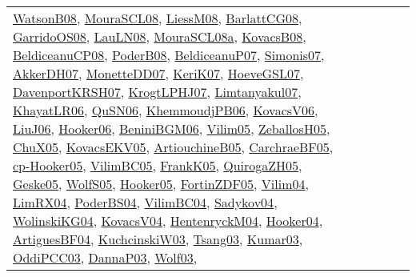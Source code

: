 {\begin{longtable}{lp{3cm}>{\raggedright}p{6cm}>{\raggedright}p{6cm}p{8cm}}
\href{papers/WatsonB08.pdf}{WatsonB08}\cite{WatsonB08}, \href{papers/MouraSCL08.pdf}{MouraSCL08}\cite{MouraSCL08}, \href{articles/LiessM08.pdf}{LiessM08}\cite{LiessM08}, \href{papers/BarlattCG08.pdf}{BarlattCG08}\cite{BarlattCG08}, \href{articles/GarridoOS08.pdf}{GarridoOS08}\cite{GarridoOS08}, \href{papers/LauLN08.pdf}{LauLN08}\cite{LauLN08}, \href{papers/MouraSCL08a.pdf}{MouraSCL08a}\cite{MouraSCL08a}, \href{articles/KovacsB08.pdf}{KovacsB08}\cite{KovacsB08}, \href{papers/BeldiceanuCP08.pdf}{BeldiceanuCP08}\cite{BeldiceanuCP08}, \href{papers/PoderB08.pdf}{PoderB08}\cite{PoderB08}, \href{papers/BeldiceanuP07.pdf}{BeldiceanuP07}\cite{BeldiceanuP07}, \href{articles/Simonis07.pdf}{Simonis07}\cite{Simonis07}, \href{papers/AkkerDH07.pdf}{AkkerDH07}\cite{AkkerDH07}, \href{papers/MonetteDD07.pdf}{MonetteDD07}\cite{MonetteDD07}, \href{papers/KeriK07.pdf}{KeriK07}\cite{KeriK07}, \href{papers/HoeveGSL07.pdf}{HoeveGSL07}\cite{HoeveGSL07}, \href{papers/DavenportKRSH07.pdf}{DavenportKRSH07}\cite{DavenportKRSH07}, \href{papers/KrogtLPHJ07.pdf}{KrogtLPHJ07}\cite{KrogtLPHJ07}, \href{papers/Limtanyakul07.pdf}{Limtanyakul07}\cite{Limtanyakul07}, \href{articles/KhayatLR06.pdf}{KhayatLR06}\cite{KhayatLR06}, \href{papers/QuSN06.pdf}{QuSN06}\cite{QuSN06}, \href{papers/KhemmoudjPB06.pdf}{KhemmoudjPB06}\cite{KhemmoudjPB06}, \href{papers/KovacsV06.pdf}{KovacsV06}\cite{KovacsV06}, \href{papers/LiuJ06.pdf}{LiuJ06}\cite{LiuJ06}, \href{articles/Hooker06.pdf}{Hooker06}\cite{Hooker06}, \href{papers/BeniniBGM06.pdf}{BeniniBGM06}\cite{BeniniBGM06}, \href{papers/Vilim05.pdf}{Vilim05}\cite{Vilim05}, \href{articles/ZeballosH05.pdf}{ZeballosH05}\cite{ZeballosH05}, \href{papers/ChuX05.pdf}{ChuX05}\cite{ChuX05}, \href{papers/KovacsEKV05.pdf}{KovacsEKV05}\cite{KovacsEKV05}, \href{papers/ArtiouchineB05.pdf}{ArtiouchineB05}\cite{ArtiouchineB05}, \href{papers/CarchraeBF05.pdf}{CarchraeBF05}\cite{CarchraeBF05}, \href{papers/cp-Hooker05.pdf}{cp-Hooker05}\cite{cp-Hooker05}, \href{articles/VilimBC05.pdf}{VilimBC05}\cite{VilimBC05}, \href{papers/FrankK05.pdf}{FrankK05}\cite{FrankK05}, \href{papers/QuirogaZH05.pdf}{QuirogaZH05}\cite{QuirogaZH05}, \href{papers/Geske05.pdf}{Geske05}\cite{Geske05}, \href{papers/WolfS05.pdf}{WolfS05}\cite{WolfS05}, \href{articles/Hooker05.pdf}{Hooker05}\cite{Hooker05}, \href{papers/FortinZDF05.pdf}{FortinZDF05}\cite{FortinZDF05}, \href{papers/Vilim04.pdf}{Vilim04}\cite{Vilim04}, \href{papers/LimRX04.pdf}{LimRX04}\cite{LimRX04}, \href{articles/PoderBS04.pdf}{PoderBS04}\cite{PoderBS04}, \href{papers/VilimBC04.pdf}{VilimBC04}\cite{VilimBC04}, \href{papers/Sadykov04.pdf}{Sadykov04}\cite{Sadykov04}, \href{papers/WolinskiKG04.pdf}{WolinskiKG04}\cite{WolinskiKG04}, \href{papers/KovacsV04.pdf}{KovacsV04}\cite{KovacsV04}, \href{papers/HentenryckM04.pdf}{HentenryckM04}\cite{HentenryckM04}, \href{papers/Hooker04.pdf}{Hooker04}\cite{Hooker04}, \href{papers/ArtiguesBF04.pdf}{ArtiguesBF04}\cite{ArtiguesBF04}, \href{articles/KuchcinskiW03.pdf}{KuchcinskiW03}\cite{KuchcinskiW03}, \href{articles/Tsang03.pdf}{Tsang03}\cite{Tsang03}, \href{papers/Kumar03.pdf}{Kumar03}\cite{Kumar03}, \href{papers/OddiPCC03.pdf}{OddiPCC03}\cite{OddiPCC03}, \href{papers/DannaP03.pdf}{DannaP03}\cite{DannaP03}, \href{papers/Wolf03.pdf}{Wolf03}\cite{Wolf03}, 
\end{longtable}}
